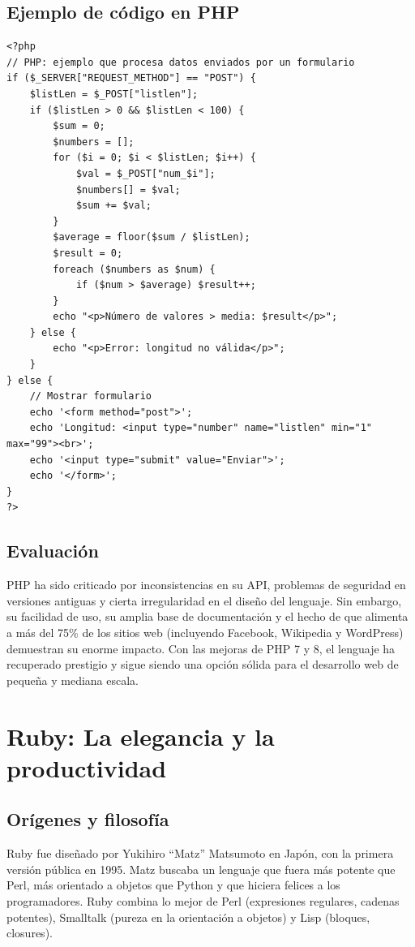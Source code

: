 \subsection{Ejemplo de código en PHP}

\begin{verbatim}
<?php
// PHP: ejemplo que procesa datos enviados por un formulario
if ($_SERVER["REQUEST_METHOD"] == "POST") {
    $listLen = $_POST["listlen"];
    if ($listLen > 0 && $listLen < 100) {
        $sum = 0;
        $numbers = [];
        for ($i = 0; $i < $listLen; $i++) {
            $val = $_POST["num_$i"];
            $numbers[] = $val;
            $sum += $val;
        }
        $average = floor($sum / $listLen);
        $result = 0;
        foreach ($numbers as $num) {
            if ($num > $average) $result++;
        }
        echo "<p>Número de valores > media: $result</p>";
    } else {
        echo "<p>Error: longitud no válida</p>";
    }
} else {
    // Mostrar formulario
    echo '<form method="post">';
    echo 'Longitud: <input type="number" name="listlen" min="1" max="99"><br>';
    echo '<input type="submit" value="Enviar">';
    echo '</form>';
}
?>
\end{verbatim}

\subsection{Evaluación}

PHP ha sido criticado por inconsistencias en su API, problemas de seguridad en versiones antiguas y cierta irregularidad en el diseño del lenguaje. Sin embargo, su facilidad de uso, su amplia base de documentación y el hecho de que alimenta a más del 75\% de los sitios web (incluyendo Facebook, Wikipedia y WordPress) demuestran su enorme impacto. Con las mejoras de PHP 7 y 8, el lenguaje ha recuperado prestigio y sigue siendo una opción sólida para el desarrollo web de pequeña y mediana escala.

\section{Ruby: La elegancia y la productividad}

\subsection{Orígenes y filosofía}

Ruby fue diseñado por Yukihiro ``Matz'' Matsumoto en Japón, con la primera versión pública en 1995. Matz buscaba un lenguaje que fuera más potente que Perl, más orientado a objetos que Python y que hiciera felices a los programadores. Ruby combina lo mejor de Perl (expresiones regulares, cadenas potentes), Smalltalk (pureza en la orientación a objetos) y Lisp (bloques, closures).

